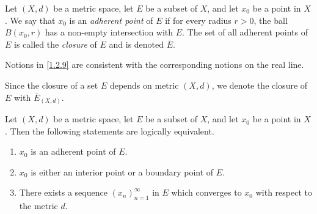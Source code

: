 \begin{definition}[Closure]\label{1.2.9}
  Let \((X, d)\) be a metric space, let \(E\) be a subset of \(X\), and let \(x_0\) be a point in \(X\).
  We say that \(x_0\) is an \emph{adherent point} of \(E\) if for every radius \(r > 0\), the ball \(B(x_0, r)\) has a non-empty intersection with \(E\).
  The set of all adherent points of \(E\) is called the \emph{closure} of \(E\) and is denoted \(\overline{E}\).
\end{definition}

\begin{note}
  Notions in \cref{1.2.9} are consistent with the corresponding notions on the real line.
\end{note}

\begin{note}
  Since the closure of a set \(E\) depends on metric \((X, d)\), we denote the closure of \(E\) with \(\overline{E}_{(X, d)}\).
\end{note}

\begin{proposition}\label{1.2.10}
  Let \((X, d)\) be a metric space, let \(E\) be a subset of \(X\), and let \(x_0\) be a point in \(X\).
  Then the following statements are logically equivalent.
  \begin{enumerate}
    \item \(x_0\) is an adherent point of \(E\).
    \item \(x_0\) is either an interior point or a boundary point of \(E\).
    \item There exists a sequence \((x_n)_{n = 1}^\infty\) in \(E\) which converges to \(x_0\) with respect to the metric \(d\).
  \end{enumerate}
\end{proposition}


